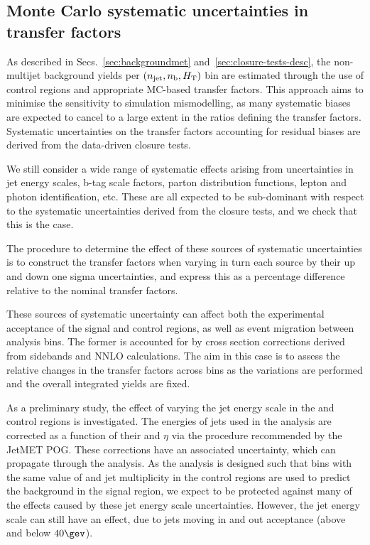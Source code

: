 \subsection{Monte Carlo systematic uncertainties in transfer factors}
\label{sec:mc-systematics}

As described in Secs.~\ref{sec:backgroundmet} and~\ref{sec:closure-tests-desc},
the non-multijet background yields per $(\njet,\nb,\scalht)$
bin are estimated through the use of control regions and
appropriate MC-based transfer factors. This approach aims to minimise
the sensitivity to simulation mismodelling, as many systematic biases are
expected to cancel to a large extent in the ratios defining the transfer
factors. Systematic uncertainties on the transfer factors accounting for
residual biases are derived from the data-driven closure tests.

We still consider a wide range of  systematic effects arising from 
uncertainties in jet energy scales, b-tag scale factors, parton distribution 
functions, lepton and photon identification, etc. These are all expected 
to be sub-dominant with respect to the systematic uncertainties derived 
from the closure tests, and we check that this is the case.

The procedure to determine the effect of these sources of systematic
uncertainties is to construct the transfer factors when varying in turn each
source by their up and down one sigma uncertainties, and express this as a
percentage difference relative to the nominal transfer factors. 

These sources of systematic uncertainty can affect both the
experimental acceptance of the signal and control regions, as well as event
migration between analysis bins. The former is accounted for by cross section
corrections derived from sidebands and NNLO calculations. The aim in this case
is to assess the relative changes in the transfer factors across bins
as the variations are performed and the overall integrated yields are fixed.


As a preliminary study, the effect of varying the jet
energy scale in the \mj and \mmj control regions is investigated.
The energies of jets used in the analysis are corrected as a function of
their \pt and $\eta$ via the procedure recommended by
the JetMET POG. These corrections have an associated uncertainty,
which can propagate through the analysis. 
As the analysis is designed such that bins
with the same value of \scalht and jet multiplicity in the control
regions are used to predict the background in the signal region, we
expect to be protected against many of the effects caused by these jet
energy scale uncertainties. However, the jet energy scale can still
have an effect, due to jets moving in and
out acceptance (above and below $40\gev$).

